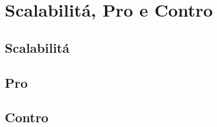 \chapter{Scalabilit\'a, Pro e Contro}\label{cap:procontr}
\section{Scalabilit\'a}\label{sez:pro}
\section{Pro}\label{sez:pro}
\section{Contro}\label{sez:contro}